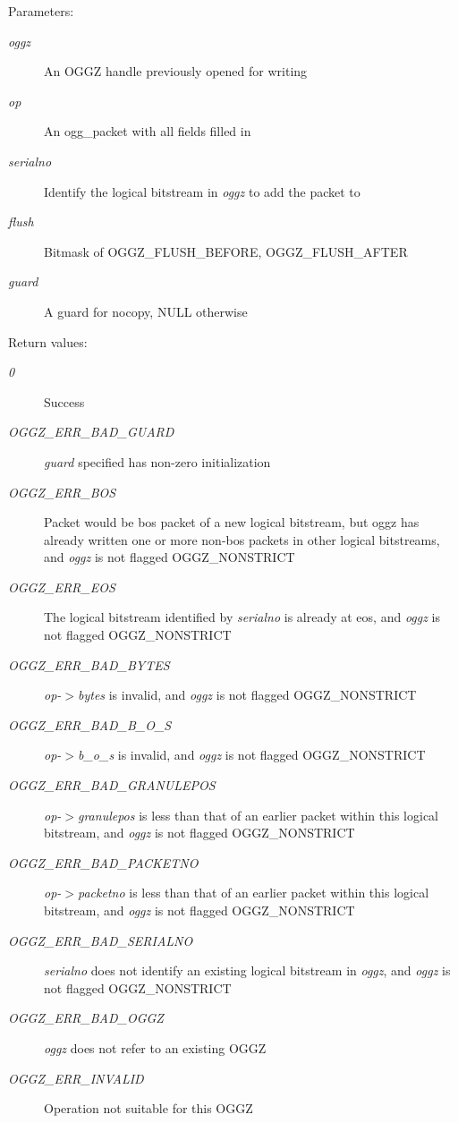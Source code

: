 \begin{Desc}
\item[Parameters:]
\begin{description}
\item[{\em oggz}]An OGGZ handle previously opened for writing \item[{\em op}]An ogg\_\-packet with all fields filled in \item[{\em serialno}]Identify the logical bitstream in {\em oggz\/} to add the packet to \item[{\em flush}]Bitmask of OGGZ\_\-FLUSH\_\-BEFORE, OGGZ\_\-FLUSH\_\-AFTER \item[{\em guard}]A guard for nocopy, NULL otherwise \end{description}
\end{Desc}
\begin{Desc}
\item[Return values:]
\begin{description}
\item[{\em 0}]Success \item[{\em OGGZ\_\-ERR\_\-BAD\_\-GUARD}]{\em guard\/} specified has non-zero initialization \item[{\em OGGZ\_\-ERR\_\-BOS}]Packet would be bos packet of a new logical bitstream, but oggz has already written one or more non-bos packets in other logical bitstreams, and {\em oggz\/} is not flagged OGGZ\_\-NONSTRICT \item[{\em OGGZ\_\-ERR\_\-EOS}]The logical bitstream identified by {\em serialno\/} is already at eos, and {\em oggz\/} is not flagged OGGZ\_\-NONSTRICT \item[{\em OGGZ\_\-ERR\_\-BAD\_\-BYTES}]{\em op-$>$bytes\/} is invalid, and {\em oggz\/} is not flagged OGGZ\_\-NONSTRICT \item[{\em OGGZ\_\-ERR\_\-BAD\_\-B\_\-O\_\-S}]{\em op-$>$b\_\-o\_\-s\/} is invalid, and {\em oggz\/} is not flagged OGGZ\_\-NONSTRICT \item[{\em OGGZ\_\-ERR\_\-BAD\_\-GRANULEPOS}]{\em op-$>$granulepos\/} is less than that of an earlier packet within this logical bitstream, and {\em oggz\/} is not flagged OGGZ\_\-NONSTRICT \item[{\em OGGZ\_\-ERR\_\-BAD\_\-PACKETNO}]{\em op-$>$packetno\/} is less than that of an earlier packet within this logical bitstream, and {\em oggz\/} is not flagged OGGZ\_\-NONSTRICT \item[{\em OGGZ\_\-ERR\_\-BAD\_\-SERIALNO}]{\em serialno\/} does not identify an existing logical bitstream in {\em oggz\/}, and {\em oggz\/} is not flagged OGGZ\_\-NONSTRICT \item[{\em OGGZ\_\-ERR\_\-BAD\_\-OGGZ}]{\em oggz\/} does not refer to an existing OGGZ \item[{\em OGGZ\_\-ERR\_\-INVALID}]Operation not suitable for this OGGZ\end{description}
\end{Desc}
